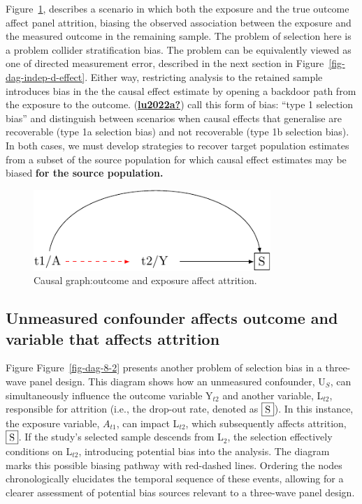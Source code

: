 \documentclass[
  singlecolumn]{report}
\begin{document}
Figure~\ref{fig-dag-8-5}, describes a scenario in which both the
exposure and the true outcome affect panel attrition, biasing the
observed association between the exposure and the measured outcome in
the remaining sample. The problem of selection here is a problem
collider stratification bias. The problem can be equivalently viewed as
one of directed measurement error, described in the next section in
Figure~\ref{fig-dag-indep-d-effect}. Either way, restricting analysis to
the retained sample introduces bias in the the causal effect estimate by
opening a backdoor path from the exposure to the outcome.
(\protect\hyperlink{ref-lu2022a}{\textbf{lu2022a?}}) call this form of
bias: ``type 1 selection bias'' and distinguish between scenarios when
causal effects that generalise are recoverable (type 1a selection bias)
and not recoverable (type 1b selection bias). In both cases, we must
develop strategies to recover target population estimates from a subset
of the source population for which causal effect estimates may be biased
\textbf{for the source population.}

\begin{figure}

{\centering \includegraphics[width=0.8\textwidth,height=\textheight]{causal-dags_files/figure-pdf/fig-dag-8-5-1.pdf}

}

\caption{\label{fig-dag-8-5}Causal graph:outcome and exposure affect
attrition.}

\end{figure}

\hypertarget{unmeasured-confounder-affects-outcome-and-variable-that-affects-attrition}{%
\subsection{Unmeasured confounder affects outcome and variable that
affects
attrition}\label{unmeasured-confounder-affects-outcome-and-variable-that-affects-attrition}}

Figure Figure~\ref{fig-dag-8-2} presents another problem of selection
bias in a three-wave panel design. This diagram shows how an unmeasured
confounder, U\(_S\), can simultaneously influence the outcome variable
Y\(_{t2}\) and another variable, L\(_{t2}\), responsible for attrition
(i.e., the drop-out rate, denoted as \(\framebox{S}\)). In this
instance, the exposure variable, \(A_{t1}\), can impact L\(_{t2}\),
which subsequently affects attrition, \(\framebox{S}\). If the study's
selected sample descends from L\(_2\), the selection effectively
conditions on L\(_{t2}\), introducing potential bias into the analysis.
The diagram marks this possible biasing pathway with red-dashed lines.
Ordering the nodes chronologically elucidates the temporal sequence of
these events, allowing for a clearer assessment of potential bias
sources relevant to a three-wave panel design.
\end{document}
